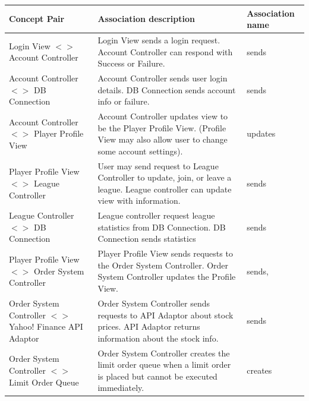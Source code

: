 \begin{centering}
\renewcommand\arraystretch{1.3}
\label{UC-3}
\begin{longtable}{|p{1.75in}| p{3in}| p{1.75in} |}
\hline
\bfseries{\color{color1}Concept Pair} &
          \bfseries{\color{color1}Association description} &
          \bfseries{\color{color1}Association name} \\ \hline

           Login View $<>$ Account Controller &
           Login View sends a login request. Account Controller can respond with Success
           or Failure. &
           sends \\ \hline

           Account Controller $<>$ DB Connection
           & Account Controller sends user login details. DB Connection sends account
           info or failure.
           & sends \\ \hline

           Account Controller $<>$ Player Profile View
           & Account Controller updates view to be the Player Profile View. (Profile
           View may also allow user to change some account settings).
           & updates \\ \hline

           Player Profile View $<>$ League Controller
           & User may send request to League Controller to update, join, or leave a league.
           League controller can update view with information.
           & sends \\ \hline

           League Controller $<>$ DB Connection
           & League controller request league statistics from DB Connection. DB Connection
           sends statistics
           & sends \\ \hline

           Player Profile View $<>$ Order System Controller
           & Player Profile View sends requests to the Order System Controller.
           Order System Controller updates the Profile View.\
           & sends,\\ \hline

           Order System Controller $<>$ Yahoo! Finance API Adaptor
           & Order System Controller sends requests to API Adaptor about stock prices.
           API Adaptor returns information about the stock info.
           & sends \\ \hline

           Order System Controller $<>$ Limit Order Queue
           & Order System Controller creates the limit order queue when a limit order
           is placed but cannot be executed immediately.
           & creates\\ \hline

\end{longtable}
\end{centering}

